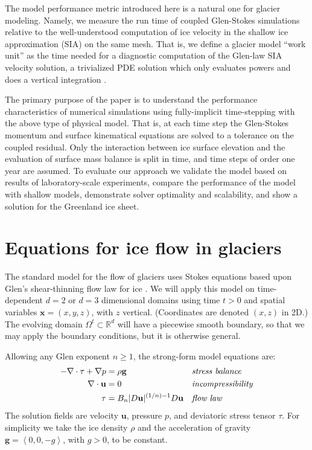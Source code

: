 \documentclass[letterpaper,final,12pt,reqno]{amsart}
\newcommand{\RR}{\mathbb{R}}
\newcommand{\bg}{\mathbf{g}}
\newcommand{\bu}{\mathbf{u}}
\newcommand{\bx}{\mathbf{x}}
\begin{document}
The model performance metric introduced here is a natural one for glacier modeling.  Namely, we measure the run time of coupled Glen-Stokes simulations relative to the well-understood computation of ice velocity in the shallow ice approximation (SIA) \cite{Fowler1997} on the same mesh.  That is, we define a glacier model ``work unit'' as the time needed for a diagnostic computation of the Glen-law SIA velocity solution, a trivialized PDE solution which only evaluates powers and does a vertical integration \cite{SchoofHewitt2013}.

The primary purpose of the paper is to understand the performance characteristics of numerical simulations using fully-implicit time-stepping with the above type of physical model.  That is, at each time step the Glen-Stokes momentum and surface kinematical equations are solved to a tolerance on the coupled residual.  Only the interaction between ice surface elevation and the evaluation of surface mass balance is split in time, and time steps of order one year are assumed.  To evaluate our approach we validate the model based on results of laboratory-scale experiments, compare the performance of the model with shallow models, demonstrate solver optimality and scalability, and show a solution for the Greenland ice sheet.


\section{Equations for ice flow in glaciers} \label{sec:strongform}

The standard model for the flow of glaciers uses Stokes equations based upon Glen's shear-thinning flow law for ice \cite{GreveBlatter2009,JouvetRappaz2011,SchoofHewitt2013}.  We will apply this model on time-dependent $d=2$ or $d=3$ dimensional domains using time $t>0$ and spatial variables $\bx=(x,y,z)$, with $z$ vertical.  (Coordinates are denoted $(x,z)$ in 2D.)  The evolving domain $\Omega^t \subset \RR^d$ will have a piecewise smooth boundary, so that we may apply the boundary conditions, but it is otherwise general.

Allowing any Glen exponent $n\ge 1$, the strong-form model equations are:
\begin{align}
- \nabla \cdot \tau + \nabla p &= \rho \bg &&\text{\emph{stress balance}} \label{forcebalance} \\
\nabla \cdot \bu &= 0 &&\text{\emph{incompressibility}} \label{incompressible} \\
\tau &= B_n |D\bu|^{(1/n) - 1} D\bu  &&\text{\emph{flow law}} \label{viscflowlaw}
\end{align}
The solution fields are velocity $\bu$, pressure $p$, and deviatoric stress tensor $\tau$.  For simplicity we take the ice density $\rho$ and the acceleration of gravity $\bg=\left<0,0,-g\right>$, with $g>0$, to be constant.
\end{document}
